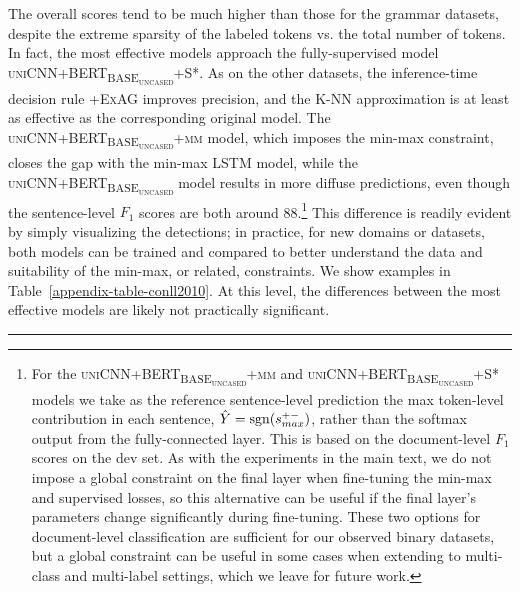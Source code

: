 \documentclass{clv3}
\begin{document}
The overall scores tend to be much higher than those for the grammar datasets, despite the extreme sparsity of the labeled tokens vs. the total number of tokens. In fact, the most effective models approach the fully-supervised model \textsc{uniCNN+BERT\textsubscript{BASE\textsubscript{uncased}}+S*}. As on the other datasets, the inference-time decision rule \textsc{+ExAG} improves precision, and the K-NN approximation is at least as effective as the corresponding original model. The \textsc{uniCNN+BERT\textsubscript{BASE\textsubscript{uncased}}+mm} model, which imposes the min-max constraint, closes the gap with the min-max LSTM model, while the \textsc{uniCNN+BERT\textsubscript{BASE\textsubscript{uncased}}} model results in more diffuse predictions, even though the sentence-level $F_1$ scores are both around 88.\footnote{For the \textsc{uniCNN+BERT\textsubscript{BASE\textsubscript{uncased}}+mm} and \textsc{uniCNN+BERT\textsubscript{BASE\textsubscript{uncased}}+S*} models we take as the reference sentence-level prediction the max token-level contribution in each sentence, $\hat{Y}=\operatorname{sgn}(s^{+-}_{max})$, rather than the softmax output from the fully-connected layer. This is based on the document-level $F_1$ scores on the dev set. As with the experiments in the main text, we do not impose a global constraint on the final layer when fine-tuning the min-max and supervised losses, so this alternative can be useful if the final layer's parameters change significantly during fine-tuning. These two options for document-level classification are sufficient for our observed binary datasets, but a global constraint can be useful in some cases when extending to multi-class and multi-label settings, which we leave for future work.} This difference is readily evident by simply visualizing the detections; in practice, for new domains or datasets, both models can be trained and compared to better understand the data and suitability of the min-max, or related, constraints. We show examples in Table~\ref{appendix-table-conll2010}. At this level, the differences between the most effective models are likely not practically significant.  

\nointerlineskip \vspace{\baselineskip}
\hspace{\fill}\rule{0.5\linewidth}{.7pt}\hspace{\fill}
\par\nointerlineskip \vspace{\baselineskip}
\end{document}
